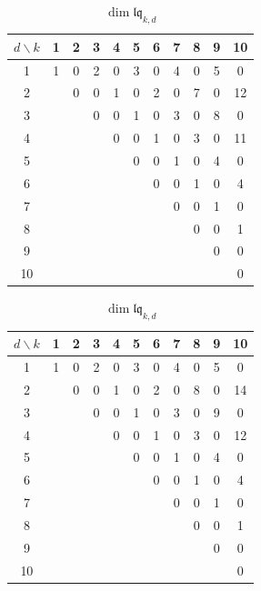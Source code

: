 \documentclass[12pt,reqno]{amsart}
\numberwithin{equation}{section}
\theoremstyle{definition}
\newcommand{\grD}{\operatorname{gr}_D}
\newcommand{\lqq}{\mathfrak{lq}}
\newcommand{\bmzero}{\mathfrak{bm}_0}
\begin{document}
\begin{table}[H]                     
\begin{minipage}{.48\linewidth}
\caption{$\dim(\grD\bmzero)_{k,d}$}  
\centering
\begin{tabular}{|c|c|c|c|c|c|c|c|c|c|c|}
\hline
$d\backslash k$& 1 & 2 & 3 & 4 & 5 & 6 & 7 & 8 & 9 & 10 \\ \hline
1 & 1  & 0  & 2 & 0 & 3 & 0 & 4 & 0 & 5 & 0 \\ \hline
2 &  & 0 & 0 & 1 & 0 & 2 & 0 & 7 & 0 & 12 \\ \hline
3 &  &  & 0 & 0 & 1 & 0 & 3 & 0 & 8 & 0 \\ \hline
4 &  &  &  & 0 & 0 & 1 & 0 & 3 & 0 & 11 \\ \hline
5 &  &  &  &  & 0 & 0 & 1 & 0 & 4 & 0 \\ \hline
6 &  &  &  &  &  & 0 & 0 & 1 & 0 & 4 \\ \hline
7 &  &  &  &  &  &  & 0 & 0 & 1 & 0 \\ \hline
8 &  &  &  &  &  &  &  & 0 & 0 & 1 \\ \hline
9 &  &  &  &  &  &  &  &  & 0 & 0 \\ \hline
10 &  &  &  &  &  &  &  &  &  & 0 \\ \hline
\end{tabular}
\end{minipage}
\hfill
\begin{minipage}{.48\linewidth}
\centering                  
\caption{$\dim\lqq_{k,d}$}   
\begin{tabular}{|c|c|c|c|c|c|c|c|c|c|c|}
\hline
$d\backslash k$& 1 & 2 & 3 & 4 & 5 & 6 & 7 & 8 & 9 & 10 \\ \hline
1 & 1  & 0  & 2 & 0 & 3 & 0 & 4 & 0 & 5 & 0 \\ \hline
2 &  & 0 & 0 & 1 & 0 & 2 & 0 & 8 & 0 & 14 \\ \hline
3 &  &  & 0 & 0 & 1 & 0 & 3 & 0 & 9 & 0 \\ \hline
4 &  &  &  & 0 & 0 & 1 & 0 & 3 & 0 & 12 \\ \hline
5 &  &  &  &  & 0 & 0 & 1 & 0 & 4 & 0 \\ \hline
6 &  &  &  &  &  & 0 & 0 & 1 & 0 & 4 \\ \hline
7 &  &  &  &  &  &  & 0 & 0 & 1 & 0 \\ \hline
8 &  &  &  &  &  &  &  & 0 & 0 & 1 \\ \hline
9 &  &  &  &  &  &  &  &  & 0 & 0 \\ \hline
10 &  &  &  &  &  &  &  &  &  & 0 \\ \hline
\end{tabular}
\end{minipage}
\end{table} 
\fi
\end{document}
